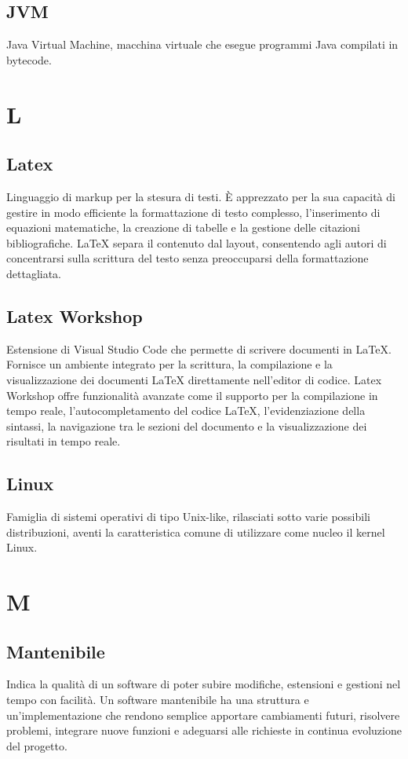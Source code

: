 \documentclass[12pt]{article}
\begin{document}
		\subsection{JVM}
			Java Virtual Machine, macchina virtuale che esegue programmi Java compilati in bytecode.
	\clearpage
	\section{L}
		\subsection{Latex}
			Linguaggio di markup per la stesura di testi. È apprezzato per la sua capacità di gestire in modo efficiente la formattazione di testo complesso, l'inserimento di equazioni matematiche, la creazione di tabelle e la gestione delle citazioni bibliografiche. LaTeX separa il contenuto dal layout, consentendo agli autori di concentrarsi sulla scrittura del testo senza preoccuparsi della formattazione dettagliata. 

		\subsection{Latex Workshop}
			Estensione di Visual Studio Code che permette di scrivere documenti in LaTeX. Fornisce un ambiente integrato per la scrittura, la compilazione e la visualizzazione dei documenti LaTeX direttamente nell'editor di codice. Latex Workshop offre funzionalità avanzate come il supporto per la compilazione in tempo reale, l'autocompletamento del codice LaTeX, l'evidenziazione della sintassi, la navigazione tra le sezioni del documento e la visualizzazione dei risultati in tempo reale.
		\subsection{Linux}
			Famiglia di sistemi operativi di tipo Unix-like, rilasciati sotto varie possibili distribuzioni, aventi la caratteristica comune di utilizzare come nucleo il kernel Linux.

	\clearpage
	\section{M}
		\subsection{Mantenibile}
			Indica la qualità di un software di poter subire modifiche, estensioni e gestioni nel tempo con facilità. Un software mantenibile ha una struttura e un’implementazione che rendono semplice apportare cambiamenti futuri, risolvere problemi, integrare nuove funzioni e adeguarsi alle richieste in continua evoluzione del progetto.
\end{document}
